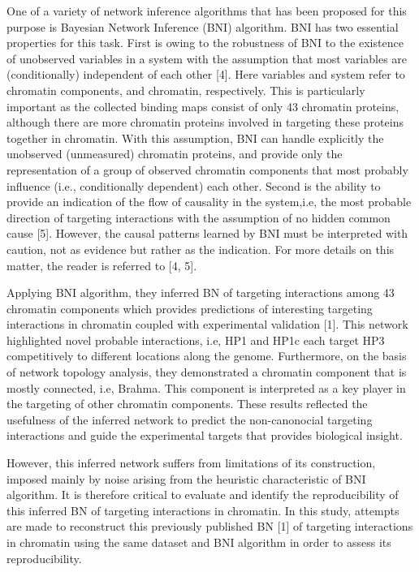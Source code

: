 \documentclass{bioinfo}
\begin{document}
One of a variety of network inference algorithms that has been proposed for this purpose is Bayesian Network Inference (BNI) algorithm. BNI has two essential properties for this task. First is owing to the robustness of BNI to the existence of unobserved variables in a system with the assumption that most variables are (conditionally) independent of each other [4]. Here variables and system refer to chromatin components, and chromatin, respectively. This is particularly important as the collected binding maps consist of only 43 chromatin proteins, although there are more chromatin proteins involved in targeting these proteins together in chromatin. With this assumption, BNI can handle explicitly the unobserved (unmeasured) chromatin proteins, and provide only the representation of a group of observed chromatin components that most probably influence (i.e., conditionally dependent) each other. Second is the ability to provide an indication of the flow of causality in the system,i.e, the most probable direction of targeting interactions with the assumption of no hidden common cause [5]. However, the causal patterns learned by BNI must be interpreted with caution, not as evidence but rather as the indication. For more details on this matter, the reader is referred to [4, 5].

Applying BNI algorithm, they inferred BN of targeting interactions among 43 chromatin components which provides predictions of interesting targeting interactions in chromatin coupled with experimental validation [1]. This network highlighted novel probable interactions, i.e, HP1 and HP1c each target HP3 competitively to different locations along the genome. Furthermore, on the basis of network topology analysis, they demonstrated a chromatin component that is mostly connected, i.e, Brahma. This component is interpreted as a key player in the targeting of other chromatin components. These results reflected the usefulness of the inferred network to predict the non-canonocial targeting interactions and guide the experimental targets that provides biological insight. 

However, this inferred network suffers from limitations of its construction, imposed mainly by noise arising from the heuristic characteristic of BNI algorithm. It is therefore critical to evaluate and identify the reproducibility of this inferred BN of targeting interactions in chromatin. In this study, attempts are made to reconstruct this previously published BN [1] of targeting interactions in chromatin using the same dataset and BNI algorithm in order to assess its reproducibility.
\end{document}
